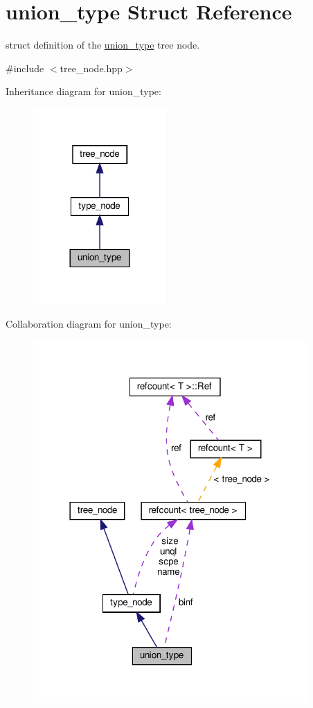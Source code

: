 \hypertarget{structunion__type}{}\section{union\+\_\+type Struct Reference}
\label{structunion__type}


struct definition of the \hyperlink{structunion__type}{union\+\_\+type} tree node.  




{\ttfamily \#include $<$tree\+\_\+node.\+hpp$>$}



Inheritance diagram for union\+\_\+type\+:
\nopagebreak
\begin{figure}[H]
\begin{center}
\leavevmode
\includegraphics[width=144pt]{dd/df1/structunion__type__inherit__graph}
\end{center}
\end{figure}


Collaboration diagram for union\+\_\+type\+:
\nopagebreak
\begin{figure}[H]
\begin{center}
\leavevmode
\includegraphics[width=297pt]{d4/db5/structunion__type__coll__graph}
\end{center}
\end{figure}
